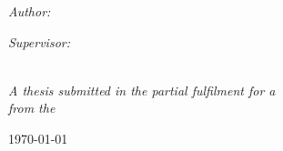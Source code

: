 \documentclass[
11pt, %
oneside, %
english, %
singlespacing, %
headsepline, %
]{MastersDoctoralThesis} %
\begin{document}
\begin{titlepage}
\begin{center}
\begin{minipage}[t]{0.4\textwidth}
\begin{flushleft} \large
\emph{Author:}\\
\href{https://devon12stone.github.io/E-Portfolio2/}{\authorname} %
\end{flushleft}
\end{minipage}
\begin{minipage}[t]{0.4\textwidth}
\begin{flushright} \large
\emph{Supervisor:} \\
\href{http://www.jamessmith.com}{\supname} %
\end{flushright}
\end{minipage}\\
\vspace{2cm}
\large \textit{A thesis submitted in the partial fulfilment for a \degreename}\\[0.3cm] %
\textit{from the}\\[1cm]
{\scshape\LARGE\facname\par}\vspace{1cm} %
{\large \today}\\[2cm] %
\vfill
\end{center}
\end{titlepage}

\end{document}
